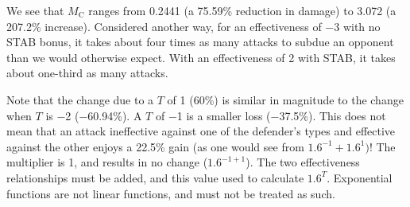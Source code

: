 We see that $M_\mathrm{C}$ ranges
 from 0.2441 (a 75.59\% reduction in damage) to 3.072
 (a 207.2\% increase).
Considered another way, for an effectiveness of −3 with no STAB bonus,
 it takes about four times as many attacks to subdue an opponent than
 we would otherwise expect.
With an effectiveness of 2 with STAB, it takes about one-third as many attacks.

Note that the change due to a $T$ of 1 (60\%) is similar in magnitude to the change
 when $T$ is −2 (−60.94\%). A $T$ of −1 is a smaller loss (\hbox{−37.5\%}).
This does not mean that an attack ineffective against one of the defender's types and
 effective against the other enjoys a 22.5\% gain (as one would see from $1.6^{−1} + 1.6^{1})$!
The multiplier is 1, and results in no change ($1.6^{−1+1}$).
The two effectiveness relationships must be added, and this value used to
 calculate $1.6^T$.
Exponential functions are not linear functions, and must not be treated as such.

